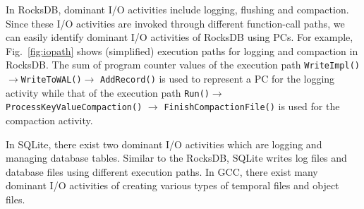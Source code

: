 In RocksDB, dominant I/O activities include logging, flushing and compaction.
Since these I/O activities are invoked through different 
function-call paths, we can easily
identify dominant I/O activities of RocksDB using PCs.  
For example, Fig.~\ref{fig:iopath} shows 
(simplified) execution paths for 
logging and compaction in RocksDB.  
The sum of program counter values of the execution path 
\texttt{WriteImpl()}$\rightarrow$\texttt{WriteToWAL()}$\rightarrow$ \texttt{AddRecord()} is used
to represent a PC for the logging activity while that of the execution path
\texttt{Run()}$\rightarrow$ \texttt{ProcessKeyValueCompaction()} $\rightarrow$ \texttt{FinishCompactionFile()} 
is used for the compaction activity.

In SQLite, there exist two dominant I/O activities which are logging and managing 
database tables.
Similar to the RocksDB, SQLite writes log files and database files using different
execution paths.
In GCC, there exist many dominant I/O activities of creating various types of 
temporal files and object files.



